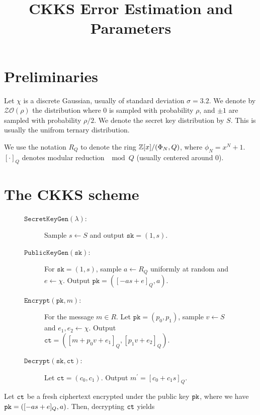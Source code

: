 \documentclass[a4paper,10pt]{article}
\title{CKKS Error Estimation and Parameters}
\author{}
\date{}
\begin{document}

\maketitle

\section{Preliminaries}
Let $\chi$ is a discrete Gaussian, usually of standard
deviation $\sigma = 3.2$. We denote by $\mathcal{ZO}(\rho)$ the distribution where $0$ is 
sampled with probability $\rho$, and $\pm 1$ are sampled with probability $\rho/2$.
We denote the secret key distribution by $S$. This is usually the unifrom ternary distribution. 

We use the notation $R_Q$ to denote the ring $\mathbb{Z}[x]/(\Phi_N, Q)$, where 
$\phi_N = x^N + 1$. $[\cdot]_Q$ denotes modular reduction $\mod Q$ (usually centered around 0).

\section{The CKKS scheme}

\begin{figure}[h]
	\begin{description}	
		\item[$\texttt{SecretKeyGen}(\lambda)$:] Sample $s \leftarrow S$ and 
	output \( \texttt{sk}=(1,s)\). 
		
		\item[$\texttt{PublicKeyGen}(\texttt{sk})$:]   For $\texttt{sk}=(1,s)$, sample $a \leftarrow R_Q$ 
		uniformly at random and $e \leftarrow \chi$. Output \(\texttt{pk}=\left([-as + e]_Q , a\right)\). 
		
		\item[$\texttt{Encrypt}(\texttt{pk},m)$:] For the message $m \in R$. Let $\texttt{pk} = 
		(p_0,p_1)$, sample $v \leftarrow S$ and $e_1,e_2 \leftarrow \chi$. Output
		\( \texttt{ct} = \left([m + p_0 v + e_1]_Q , [p_1 v + e_2]_Q \right)\). 
		
		\item[$\texttt{Decrypt}(\texttt{sk},\texttt{ct})$:]   Let $\texttt{ct} = (c_0,c_1)$. Output
		$m^\prime = [c_0+ c_1 s]_Q$. 
	\end{description}
\end{figure}

Let $\texttt{ct}$ be a fresh ciphertext encrypted under the public key $\texttt{pk}$, where we have
$\texttt{pk} = \left([-as + e]_Q , a\right)$. Then, decrypting $\texttt{ct}$ yields
\end{document}
